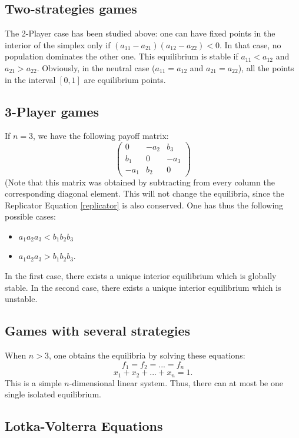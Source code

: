 \subsection{Two-strategies games}
The 2-Player case has been studied above: one can have fixed points in the interior of the simplex only if $(a_{11}-a_{21})(a_{12}-a_{22})<0.$ In that case, no population dominates the other one. This equilibrium is stable if $a_{11}<a_{12}$ and $a_{21}>a_{22}$. Obviously, in the neutral case ($a_{11}=a_{12}$ and $a_{21}=a_{22}$), all the points in the interval $[0,1]$ are equilibrium points.

\subsection{3-Player games}
If $n=3$, we have the following payoff matrix:
\[
\begin{pmatrix}
	0 & -a_{2} & b_{3} \\
	b_{1} & 0 & -a_{3} \\
	-a_{1} & b_2 & 0
\end{pmatrix}
\]
(Note that this matrix was obtained by subtracting from every column the corresponding diagonal element.  This will not change the equilibria, since the Replicator Equation \eqref{replicator} is also conserved.  One has thus the following possible cases:
\begin{itemize}
\item $a_1a_2a_3<b_1b_2b_3$
\item $a_1a_2a_3>b_1b_2b_3.$
\end{itemize}
In the first case, there exists a unique interior equilibrium which is globally stable.  In the second case, there exists a unique interior equilibrium which is unstable.
\subsection{Games with several strategies}
When $n>3$, one obtains the equilibria by solving these equations:
\[f_1 = f_2 = ... = f_n\]
\[x_1+x_2+...+x_n = 1.\]
This is a simple $n$-dimensional linear system.  Thus, there can at most be one single isolated equilibrium.
\subsection{Lotka-Volterra Equations}

